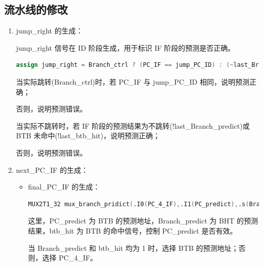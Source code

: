 \documentclass{article}
\begin{document}
\subsection{流水线的修改}
\begin{enumerate}
    \item jump\_right 的生成：\par
    jump\_right 信号在 ID 阶段生成，用于标识 IF 阶段的预测是否正确。\par
    \begin{lstlisting}[language=Verilog]
    assign jump_right = Branch_ctrl ? (PC_IF == jump_PC_ID) : (~last_Branch_predict || ~last_btb_hit);
    \end{lstlisting}
    当实际跳转(Branch\_ctrl)时，若 PC\_IF 与 jump\_PC\_ID 相同，说明预测正确；\par
    否则，说明预测错误。\par
    当实际不跳转时，若 IF 阶段的预测结果为不跳转(!last\_Branch\_predict)或 BTB 未命中(!last\_btb\_hit)，说明预测正确；\par
    否则，说明预测错误。\par

    \item next\_PC\_IF 的生成：\par
    \begin{itemize}
        \item final\_PC\_IF 的生成：\par
        \begin{lstlisting}[language=Verilog]
    MUX2T1_32 mux_branch_pridict(.I0(PC_4_IF),.I1(PC_predict),.s(Branch_predict && btb_hit),.o(final_PC_IF)); // choose the predicted PC or the next PC
        \end{lstlisting}
        这里，PC\_predict 为 BTB 的预测地址，Branch\_predict 为 BHT 的预测结果，btb\_hit 为 BTB 的命中信号，控制 PC\_predict 是否有效。\par
        当 Branch\_predict 和 btb\_hit 均为 1 时，选择 BTB 的预测地址；否则，选择 PC\_4\_IF。\par


\end{itemize}
\end{enumerate}
\end{document}
